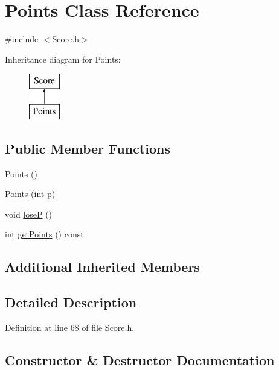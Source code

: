 \hypertarget{class_points}{}\section{Points Class Reference}
\label{class_points}


{\ttfamily \#include $<$Score.\+h$>$}

Inheritance diagram for Points\+:\begin{figure}[H]
\begin{center}
\leavevmode
\includegraphics[height=2.000000cm]{class_points}
\end{center}
\end{figure}
\subsection*{Public Member Functions}
\begin{DoxyCompactItemize}
\item 
\hyperlink{class_points_aa4e68083d98bd04233c9753dfe1e46ab}{Points} ()
\item 
\hyperlink{class_points_a371350e3342fdf8604fbae49bce96664}{Points} (int p)
\item 
void \hyperlink{class_points_a403a4aace0fcb9564687f35163024b04}{loseP} ()
\item 
int \hyperlink{class_points_a0bcaad8a1ad4a694fb83200eec97c9ce}{get\+Points} () const
\end{DoxyCompactItemize}
\subsection*{Additional Inherited Members}


\subsection{Detailed Description}


Definition at line 68 of file Score.\+h.



\subsection{Constructor \& Destructor Documentation}
\hypertarget{class_points_aa4e68083d98bd04233c9753dfe1e46ab}{}\label{class_points_aa4e68083d98bd04233c9753dfe1e46ab} 
